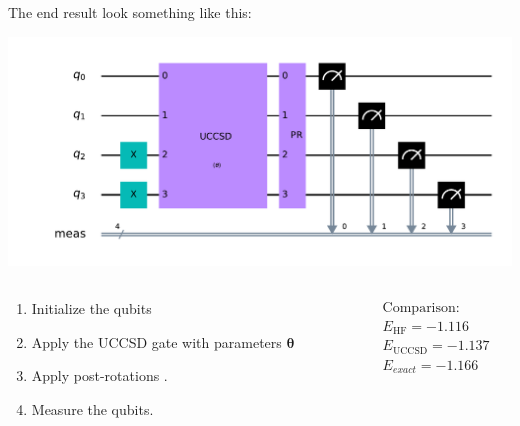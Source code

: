 \documentclass{beamer}
\renewcommand{\(}{\left(}
\renewcommand{\)}{\right)}
\renewcommand{\[}{\left[}
\renewcommand{\]}{\right]}
\begin{document}
\begin{frame}
    \frametitle{}
    The end result look something like this: 
    \begin{center}
        \includegraphics[scale=0.445, trim = 65 0 0 0 , clip]{uccsd_qc.pdf}
    \end{center}
    \begin{columns}
        \begin{column}[]{0.7\textwidth}
            \begin{enumerate}
                \item Initialize the qubits 
                \item Apply the UCCSD gate with parameters $\bm \theta$
                \item Apply post-rotations .
                \item Measure the qubits.
            \end{enumerate}
        \end{column}
        \begin{column}[]{0.3\textwidth}
            \begin{align*}
                &\text{Comparison:}\\
                &E_{\text{HF}} = -1.116\\
                &E_{\text{UCCSD}} = -1.137 \\ 
                &E_{exact} = -1.166
            \end{align*}
        \end{column}
    \end{columns}
\end{frame}
\end{document}
